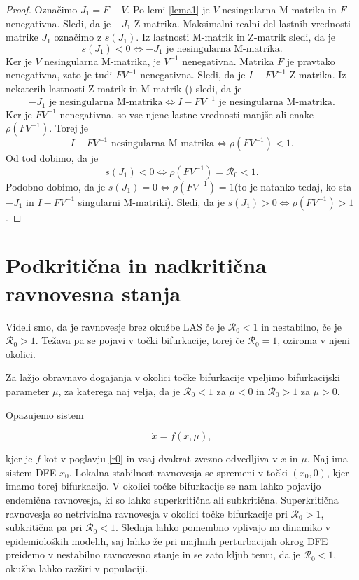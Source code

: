 \documentclass[a4paper,12pt]{article}
\newcommand{\todo}[1]{{\color{red}{#1}}}
\newcommand{\R}{\mathcal R}
\begin{document}
\begin{proof}
    Označimo \(J_1=F-V\). Po lemi \ref{lema1} je \(V\) nesingularna M-matrika in \(F\) nenegativna. 
    Sledi, da je \(-J_1\) Z-matrika. 
    Maksimalni realni del lastnih vrednosti matrike \(J_1\) označimo z \(s(J_1)\). Iz lastnosti 
    M-matrik in Z-matrik sledi, da je 
    \[s(J_1)<0 \Leftrightarrow -J_1\textrm{ je nesingularna M-matrika}.\]
    Ker je \(V\) nesingularna M-matrika, je \(V^{-1}\) nenegativna. Matrika \(F\) je pravtako 
    nenegativna, zato je tudi \(FV^{-1}\) nenegativna. Sledi, da je \(I-FV^{-1}\) Z-matrika. 
    Iz nekaterih lastnosti Z-matrik in M-matrik (\todo{vir}) sledi, da je 
    \[-J_1\textrm{ je nesingularna M-matrika}\Leftrightarrow I-FV^{-1} \textrm{ je nesingularna M-matrika}.\]
    Ker je \(FV^{-1}\) nenegativna, so vse njene lastne vrednosti manjše ali enake \(\rho(FV^{-1})\). Torej je 
    \[I-FV^{-1}\textrm{ nesingularna M-matrika}\Leftrightarrow \rho(FV^{-1})<1. \]
    Od tod dobimo, da je 
    \[s(J_1)<0 \Leftrightarrow \rho(FV^{-1})=\R_0<1.\]
    Podobno dobimo, da je \(s(J_1)=0\Leftrightarrow \rho(FV^{-1})=1\)(to je natanko tedaj, ko sta \(-J_1\) in \(I-FV^{-1}\) singularni M-matriki). 
    Sledi, da je \(s(J_1)>0 \Leftrightarrow \rho(FV^{-1})>1\).

\end{proof}

\section{Podkritična in nadkritična ravnovesna stanja}

Videli smo, da je ravnovesje brez okužbe LAS če je \(\R_0<1\) in nestabilno, če 
je \(\R_0>1\). Težava pa se pojavi v točki bifurkacije, torej če \(\R_0=1\), oziroma
v njeni okolici.

Za lažjo obravnavo dogajanja v okolici točke bifurkacije vpeljimo bifurkacijski parameter
\(\mu\), za katerega naj velja, da je \(\R_0<1\) za \(\mu<0\) in \(\R_0>1\) za \(\mu>0\).

Opazujemo sistem 

\begin{equation}\label{eq4}
\dot{x}=f(x,\mu),
\end{equation}

kjer je \(f\) kot v poglavju \ref{r0} in vsaj dvakrat zvezno odvedljiva v \(x\) in \(\mu\).
Naj ima sistem DFE \(x_0\). Lokalna stabilnost ravnovesja se spremeni v točki \((x_0,0)\), kjer 
imamo torej bifurkacijo. V okolici točke bifurkacije se nam lahko pojavijo endemična 
ravnovesja, ki so lahko superkritična ali subkritična. Superkritična ravnovesja so 
netrivialna \todo{stabilna?} ravnovesja v okolici točke bifurkacije pri \(\R_0>1\),
subkritična pa pri \(\R_0<1\). Slednja lahko pomembno vplivajo na dinamiko v 
epidemioloških modelih, saj lahko že pri majhnih perturbacijah okrog DFE preidemo
v nestabilno ravnovesno stanje in se zato kljub temu, da je \(\R_0<1\), okužba lahko 
razširi v populaciji.
\end{document}
